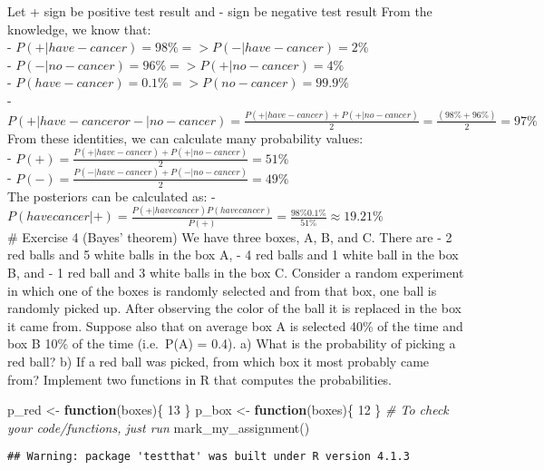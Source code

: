\documentclass[
]{article}
\newenvironment{Shaded}{\begin{snugshade}}{\end{snugshade}}
\newcommand{\CommentTok}[1]{\textcolor[rgb]{0.56,0.35,0.01}{\textit{#1}}}
\newcommand{\ControlFlowTok}[1]{\textcolor[rgb]{0.13,0.29,0.53}{\textbf{#1}}}
\newcommand{\DecValTok}[1]{\textcolor[rgb]{0.00,0.00,0.81}{#1}}
\newcommand{\FunctionTok}[1]{\textcolor[rgb]{0.00,0.00,0.00}{#1}}
\newcommand{\NormalTok}[1]{#1}
\newcommand{\OtherTok}[1]{\textcolor[rgb]{0.56,0.35,0.01}{#1}}
\begin{document}
Let + sign be positive test result and - sign be negative test result
From the knowledge, we know that:\\
- \(P(+|have-cancer) = 98\% => P(-|have-cancer) = 2\%\)\\
- \(P(-|no-cancer) = 96\% => P(+|no-cancer) = 4\%\)\\
- \(P(have-cancer) = 0.1\% => P(no-cancer) = 99.9\%\)\\
-
\(P(+|have-cancer or -|no-cancer) = \frac{P(+|have-cancer) + P(+|no-cancer)}{2} = \frac{(98\% + 96\%)}{2} = 97\%\)\\
From these identities, we can calculate many probability values:\\
- \(P(+) = \frac{P(+|have-cancer) + P(+|no-cancer)}{2} = 51\%\)\\
- \(P(-) = \frac{P(-|have-cancer) + P(-|no-cancer)}{2} = 49\%\)\\
The posteriors can be calculated as: -
\(P(have cancer|+) = \frac{P(+|have cancer)P(have cancer)}{P(+)} = \frac{98\% 0.1\%}{51\%} \approx 19.21\%\)\\
\# Exercise 4 (Bayes' theorem) We have three boxes, A, B, and C. There
are - 2 red balls and 5 white balls in the box A, - 4 red balls and 1
white ball in the box B, and - 1 red ball and 3 white balls in the box
C. Consider a random experiment in which one of the boxes is randomly
selected and from that box, one ball is randomly picked up. After
observing the color of the ball it is replaced in the box it came from.
Suppose also that on average box A is selected 40\% of the time and box
B 10\% of the time (i.e.~P(A) = 0.4). a) What is the probability of
picking a red ball? b) If a red ball was picked, from which box it most
probably came from? Implement two functions in R that computes the
probabilities.

\begin{Shaded}
\begin{Highlighting}[]
\NormalTok{p\_red }\OtherTok{\textless{}{-}} \ControlFlowTok{function}\NormalTok{(boxes)\{}
  \DecValTok{13}
\NormalTok{\}}
\NormalTok{p\_box }\OtherTok{\textless{}{-}} \ControlFlowTok{function}\NormalTok{(boxes)\{}
  \DecValTok{12}
\NormalTok{\}}
\CommentTok{\# To check your code/functions, just run}
\FunctionTok{mark\_my\_assignment}\NormalTok{()}
\end{Highlighting}
\end{Shaded}

\begin{verbatim}
## Warning: package 'testthat' was built under R version 4.1.3
\end{verbatim}
\end{document}
